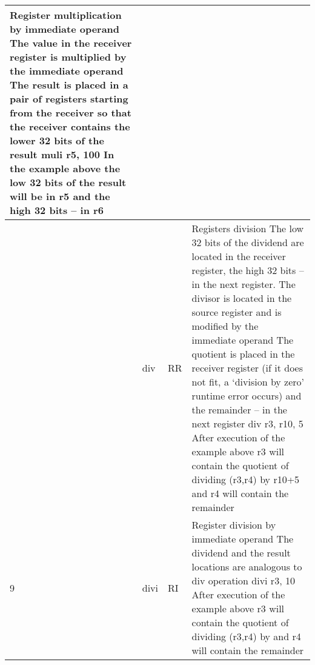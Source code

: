\documentclass{article}
\newcommand{\St}[1]{{\fontfamily{qcr}\selectfont #1}}
\newcommand{\Ss}[1]{{\fontfamily{cmss}\selectfont #1}}
\begin{document}
{\begin{table}[h!]
\begin{tabular}{| >{\centering\arraybackslash} m{1cm} | >{\centering\arraybackslash} m{1.4cm} | >{\centering\arraybackslash} m{1.2cm} | m{11.6cm} |}
 Register multiplication by immediate operand \newline
 The value in the receiver register is multiplied by the immediate operand \newline
 The result is placed in a pair of registers starting from the receiver \newline
 so that the receiver contains the lower 32 bits of the result \newline
 \St{muli r5, 100} \newline
 In the example above the low 32 bits of the result will be in \St{r5} \newline
 and the high 32 bits -- in \St{r6}\\
 
 \hline
 
 8 & \St{div} & \Ss{RR} &
 
 Registers division \newline
 The low 32 bits of the dividend are located in the receiver register, \newline
 the high 32 bits -- in the next register. The divisor is located in the source \newline
 register and is modified by the immediate operand \newline
 The quotient is placed in the receiver register (if it does not fit, a \lq division \newline
 by zero\rq{} runtime error occurs) and the remainder -- in the next register \newline
 \St{div r3, r10, 5} \newline
 After execution of the example above \St{r3} will contain the quotient of dividing \newline
 \St{(r3,r4)} by \St{r10+5} and \St{r4} will contain the remainder \\
 
 \hline
 
 9 & \St{divi} & \Ss{RI} &
 
 Register division by immediate operand \newline
 The dividend and the result locations are analogous to \St{div} operation \newline
 \St{divi r3, 10} \newline
 After execution of the example above \St{r3} will contain the quotient of dividing \newline
 \St{(r3,r4)} by \St{10} and \St{r4} will contain the remainder \\
 
 \hline
 
\end{tabular}
\end{table}
}
\end{document}

